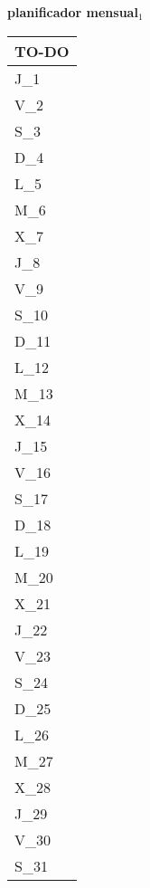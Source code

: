 \clearpage
\raggedright{
	\fontsize{25}{50}\selectfont
	\textbf{\NextYear}
}\scriptsize{\textbf{planificador mensual$_1$}}\\[11.3pt]



	\noindent\dotfill
	\renewcommand{\arraystretch}{1.5}\scriptsize
		\begin{longtabu} to \textwidth { X[l]}
		\centering \small{\textbf{TO-DO}} \\
		\toprule
		J_{1} \dotfill\\
		V_{2} \dotfill\\
		S_{3} \dotfill\\
		D_{4} \dotfill\\
		\hline
		L_{5} \dotfill\\
		M_{6} \dotfill\\
		X_{7} \dotfill\\
		J_{8} \dotfill\\
		V_{9} \dotfill\\
		S_{10} \dotfill\\
		D_{11} \dotfill\\
		\hline
		L_{12} \dotfill\\
		M_{13} \dotfill\\
		X_{14} \dotfill\\
		J_{15} \dotfill\\
		V_{16} \dotfill\\
		S_{17} \dotfill\\
		D_{18} \dotfill\\
		\hline
		L_{19} \dotfill\\
		M_{20} \dotfill\\
		X_{21} \dotfill\\
		J_{22} \dotfill\\
		V_{23} \dotfill\\
		S_{24} \dotfill\\
		D_{25} \dotfill\\
		\hline
		L_{26} \dotfill\\
		M_{27} \dotfill\\
		X_{28} \dotfill\\
		J_{29} \dotfill\\
		V_{30} \dotfill\\
		S_{31} \dotfill\\

		\bottomrule

	\end{longtabu}


\clearpage

